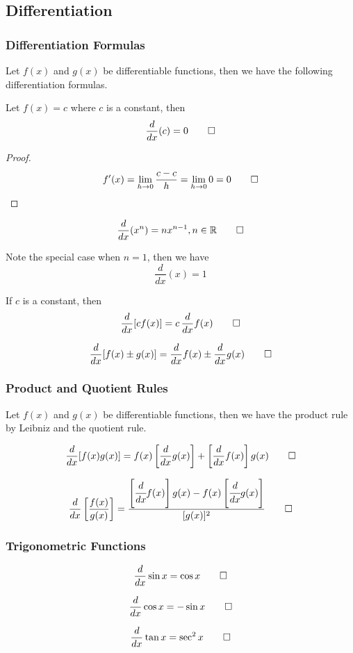 \subsection{Differentiation}
\subsubsection{Differentiation Formulas}
Let \(f(x)\) and \(g(x)\) be differentiable functions, then we have the
following differentiation formulas.
\begin{theorem}
    Let \(f(x)=c\) where \(c\) is a constant, then \[\frac{d}{dx}(c)=0\qedhere\]
\end{theorem}
\begin{proof}
    \[f'(x)=\lim_{h\to 0}\frac{c-c}{h}=\lim_{h\to 0}0=0\qedhere\]
\end{proof}
\begin{theorem}
    \[\frac{d}{dx}(x^n)=nx^{n-1},n\in\mathbb{R}\qedhere\]
\end{theorem}
Note the special case when \(n=1\), then we have \[\frac{d}{dx}(x)=1\]
\begin{theorem}
    If \(c\) is a constant, then \[\frac{d}{dx}[cf(x)]=c\,\frac{d}{dx}f(x)\qedhere\]
\end{theorem}
\begin{theorem}
    \[\frac{d}{dx}[f(x)\pm g(x)]=\frac{d}{dx}f(x)\pm \frac{d}{dx}g(x)\qedhere\]
\end{theorem}

\subsubsection{Product and Quotient Rules}
Let \(f(x)\) and \(g(x)\) be differentiable functions, then we have the
product rule by Leibniz and the quotient rule.
\begin{theorem}
    \[\frac{d}{dx}[f(x)g(x)]=f(x)\left[\frac{d}{dx}g(x)\right]
    +\left[\frac{d}{dx}f(x)\right]g(x)\qedhere\]
\end{theorem}
\begin{theorem}
    \[\frac{d}{dx}\left[\frac{f(x)}{g(x)}\right]=\frac{\left[\cfrac{d}{dx}f(x)\right]g(x)
    -f(x)\left[\cfrac{d}{dx}g(x)\right]}{[g(x)]^2}\qedhere\]
\end{theorem}

\subsubsection{Trigonometric Functions}
\begin{theorem}
    \[\frac{d}{dx}\sin x=\cos x\qedhere\]
\end{theorem}
\begin{theorem}
    \[\frac{d}{dx}\cos x=-\sin x\qedhere\]
\end{theorem}
\begin{theorem}
    \[\frac{d}{dx}\tan x=\sec^2 x\qedhere\]
\end{theorem}

